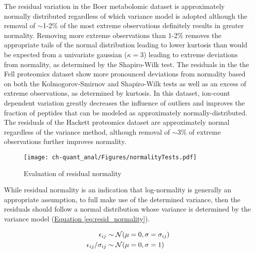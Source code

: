 The residual variation in the Boer metabolomic dataset is approximately normally distributed regardless of which variance model is adopted although the removal of $\sim$1-2\% of the most extreme observations definitely results in greater normality.  Removing more extreme observations than 1-2\% removes the appropriate tails of the normal distribution leading to lower kurtosis than would be expected from a univariate gaussian ($\kappa = 3$) leading to extreme deviations from normality, as determined by the Shapiro-Wilk test. The residuals in the the Fell proteomics dataset show more pronounced deviations from normality based on both the Kolmogorov-Smirnov and Shapiro-Wilk tests as well as an excess of extreme observations, as determined by kurtosis. In this dataset, ion-count dependent variation greatly decreases the influence of outliers and improves the fraction of peptides that can be modeled as approximately normally-distributed. The residuals of the Hackett proteomics dataset are approximately normal regardless of the variance method, although removal of $\sim$3\% of extreme observations further improves normality.

\begin{figure}[h!]
\begin{center}
\texttt{[image: ch-quant\_anal/Figures/normalityTests.pdf]}
\caption[Evaluation of residual normality]{Evaluation of residual normality}
\label{ch-quant_anal:normalityTests}
\end{center}
\end{figure}

While residual normality is an indication that log-normality is generally an appropriate assumption, to full make use of the determined variance, then the residuals should follow a normal distribution whose variance is determined by the variance model (\hyperref[eq:resid_normality]{Equation \ref{eq:resid_normality}}).

\begin{align}
\epsilon_{ij} &\sim \mathcal{N}(\mu = 0, \sigma = \sigma_{ij})\notag\\
\epsilon_{ij} / \sigma_{ij} &\sim \mathcal{N}(\mu = 0, \sigma = 1)\label{eq:resid_normality}
\end{align}

